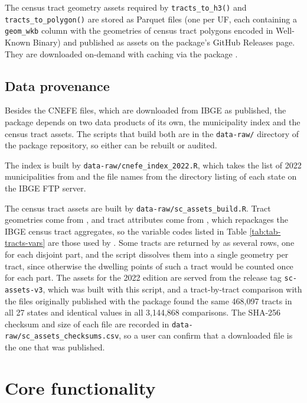 The census tract geometry assets required by \texttt{tracts\_to\_h3()} and
\texttt{tracts\_to\_polygon()} are stored as Parquet files (one per UF, each
containing a \texttt{geom\_wkb} column with the geometries of census tract
polygons encoded in Well-Known Binary) and published as assets on the
package's GitHub Releases page. They are downloaded on-demand with
caching via the  package \citep{piggyback2023}.

\subsection{Data provenance}\label{data-provenance}

Besides the CNEFE files, which are downloaded from IBGE as published,
the package depends on two data products of its own, the municipality
index and the census tract assets. The scripts that build both are in
the \texttt{data-raw/} directory of the package repository, so either can be
rebuilt or audited.

The index is built by \texttt{data-raw/cnefe\_index\_2022.R}, which takes the
list of 2022 municipalities from  and the file names from
the directory listing of each state on the IBGE FTP server.

The census tract assets are built by \texttt{data-raw/sc\_assets\_build.R}. Tract
geometries come from , and tract attributes come from
 \citep{pereira2026censobr}, which repackages the IBGE census tract
aggregates, so the variable codes listed in Table
\ref{tab:tab-tracts-vars} are those used by . Some
tracts are returned by  as several rows, one for each
disjoint part, and the script dissolves them into a single geometry per
tract, since otherwise the dwelling points of such a tract would be
counted once for each part. The assets for the 2022 edition are served
from the release tag \texttt{sc-assets-v3}, which was built with this script,
and a tract-by-tract comparison with the files originally published
with the package found the same 468,097 tracts in all 27 states and
identical values in all 3,144,868 comparisons. The SHA-256 checksum and size of each
file are recorded in \texttt{data-raw/sc\_assets\_checksums.csv}, so a user can
confirm that a downloaded file is the one that was published.

\section{Core functionality}\label{core-functionality}

